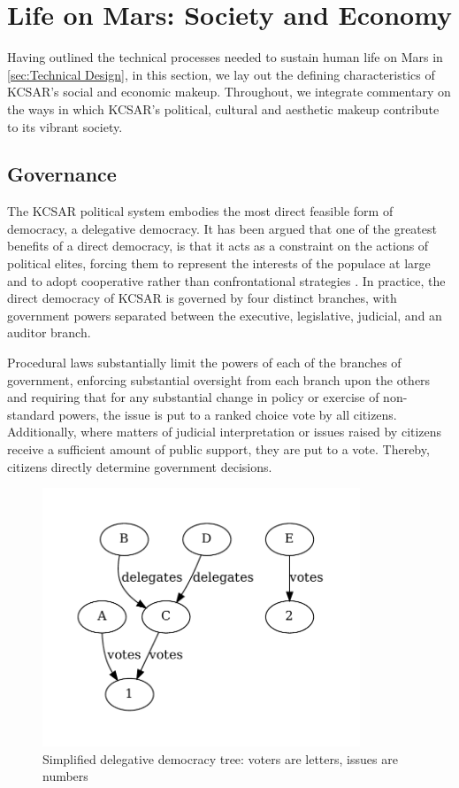 \documentclass[fleqn,10pt]{Stylesheet} %
\begin{document}

\section{Life on Mars: Society and Economy}
Having outlined the technical processes needed to sustain human life on Mars in \ref{sec:Technical Design}, in this section, we lay out the defining characteristics of KCSAR's social and economic makeup. Throughout, we integrate commentary on the ways in which KCSAR's political, cultural and aesthetic makeup contribute to its vibrant society.

\subsection{Governance}

The KCSAR political system embodies the most direct feasible form of democracy, a delegative democracy. It has been argued that one of the greatest benefits of a direct democracy, is that it acts as a constraint on the actions of political elites, forcing them to represent the interests of the populace at large and to adopt cooperative rather than confrontational strategies \cite{Papadopoulos2001}. In practice, the direct democracy of KCSAR is governed by four distinct branches, with government powers separated between the executive, legislative, judicial, and an auditor branch.

Procedural laws substantially limit the powers of each of the branches of government, enforcing substantial oversight from each branch upon the others and requiring that for any substantial change in policy or exercise of non-standard powers, the issue is put to a ranked choice vote by all citizens. Additionally, where matters of judicial interpretation or issues raised by citizens receive a sufficient amount of public support, they are put to a vote. Thereby, citizens directly determine government decisions.

\begin{figure}
    \centering
    \includegraphics[width=95mm]{figures/fig_del_democracy.pdf}
    \caption{Simplified delegative democracy tree: voters are letters, issues are numbers}
\end{figure}
\end{document}
